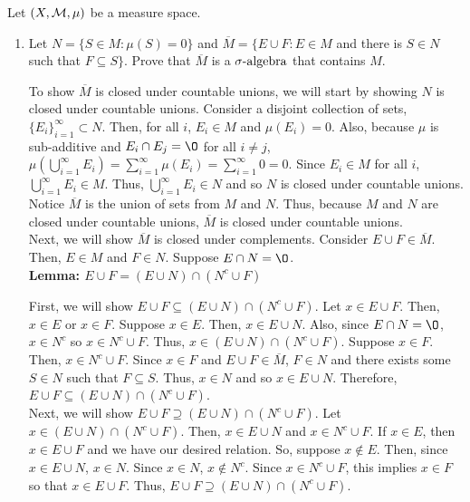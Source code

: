 Let $(X, {\mathcal M}, \mu)$ be a measure space.

\begin{enumerate}
\item Let $N=\{ S \in M : \mu(S)=0 \}$ and $\overline{M}=\{ E \cup F : E \in M$ and there is $S \in N$ such that $F \subseteq S \}$. Prove that $\overline{M}$ is a ${\sigma}\text{-algebra}$ that contains $M$.
\begin{pf}
	To show $\overline{M}$ is closed under countable unions, we will start by showing $N$ is closed under countable unions. Consider a disjoint collection of sets, $\{E_i\}_{i=1}^\infty \subset N$. Then, for all $i$, $E_i \in M$ and $\mu(E_i)=0$. Also, because $\mu$ is sub-additive and $E_i\cap E_j = \O$ for all $i\neq j$, $\mu\left(\bigcup_{i=1}^\infty E_i\right)=\sum_{i=1}^\infty\mu(E_i)=\sum_{i=1}^\infty 0=0$. Since $E_i \in M$ for all $i$, $\bigcup_{i=1}^\infty E_i \in M $. Thus, $\bigcup_{i=1}^\infty E_i \in N$ and so $N$ is closed under countable unions.
	Notice $\overline{M}$ is the union of sets from $M$ and $N$. Thus, because $M$ and $N$ are closed under countable unions, $\overline{M}$ is closed under countable unions. \\
	Next, we will show $\overline{M}$ is closed under complements. Consider $E \cup F \in \overline{M}$. Then, $E \in M$ and $F \in N$. Suppose $E \cap N = \O$. 
	\\
	\noindent \textbf{Lemma: $E \cup F=(E\cup N) \cap (N^c \cup F)$}
	\begin{pf}
	First, we will show $E \cup F \subseteq (E\cup N) \cap (N^c \cup F)$. Let $x \in E \cup F$. Then, $x \in E$ or $x \in F$. Suppose $x \in E$. Then, $x \in E \cup N$. Also, since $E \cap N = \O$, $x \in N^c$ so $x \in N^c \cup F$. Thus, $x \in (E\cup N) \cap (N^c \cup F)$. Suppose $x \in F$. Then, $x \in N^c \cup F$. Since $x \in F$ and $E \cup F \in \overline{M}$, $F \in N$ and there exists some $S \in N$ such that $F \subseteq S$. Thus, $x \in N$ and so $x \in E \cup N$. Therefore, $E \cup F \subseteq (E\cup N) \cap (N^c \cup F)$. \\
	Next, we will show $E \cup F \supseteq (E\cup N) \cap (N^c \cup F)$. Let $x \in (E\cup N) \cap (N^c \cup F)$. Then, $x \in E \cup N$ and $x \in N^c \cup F$. If $x \in E$, then $x \in E \cup F$ and we have our desired relation. So, suppose $x \not\in E$. Then, since $x \in E \cup N$, $x \in N$. Since $x \in N$, $x \not\in N^c$. Since $x \in N^c \cup F$, this implies $x \in F$ so that $x \in E \cup F$. Thus, $E \cup F \supseteq (E\cup N) \cap (N^c \cup F)$. 
	\end{pf}


\end{pf}
\end{enumerate}

